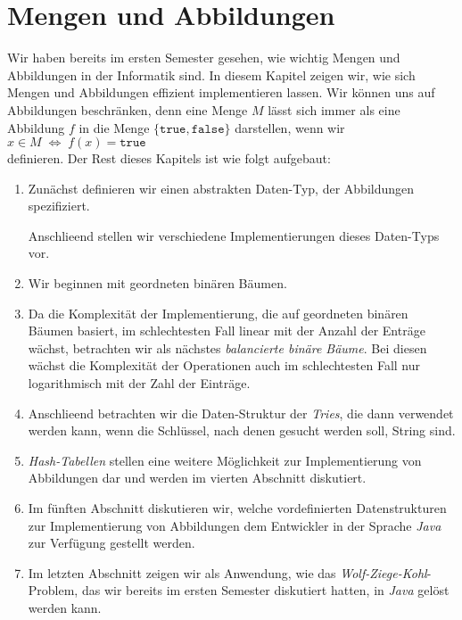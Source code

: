 \chapter{Mengen und Abbildungen}
Wir haben bereits im ersten Semester gesehen, wie wichtig Mengen und Abbildungen in
der Informatik sind.  In diesem Kapitel zeigen wir, wie sich Mengen und Abbildungen
effizient implementieren lassen.  Wir k\"onnen  uns auf Abbildungen beschr\"anken, denn eine
Menge $M$ l\"asst sich immer als eine Abbildung $f$ in die Menge $\{\mathtt{true}, \mathtt{false}\}$
darstellen, wenn wir
\\[0.2cm]
\hspace*{1.3cm}
$x \in M \; \Leftrightarrow \; f(x) = \mathtt{true}$
\\[0.2cm]
definieren.  Der Rest dieses Kapitels ist wie folgt aufgebaut:
\begin{enumerate}
\item Zun\"achst definieren wir einen abstrakten Daten-Typ, der Abbildungen spezifiziert.

      Anschlie\3end stellen wir verschiedene Implementierungen dieses Daten-Typs vor.

\item Wir beginnen mit geordneten bin\"aren B\"aumen.
\item Da die Komplexit\"at der Implementierung, die auf geordneten bin\"aren B\"aumen basiert,
      im schlechtesten Fall linear mit der Anzahl der Entr\"age w\"achst, betrachten wir als
      n\"achstes \emph{balancierte bin\"are B\"aume}.  Bei diesen w\"achst die Komplexit\"at der
      Operationen auch im schlechtesten Fall nur logarithmisch mit der Zahl der Eintr\"age.
\item Anschlie\3end betrachten wir die Daten-Struktur der \emph{Tries}, die dann verwendet
      werden kann, wenn die Schl\"ussel, nach denen gesucht werden soll, String sind.
\item \textsl{Hash-Tabellen} stellen eine weitere M\"oglichkeit zur Implementierung
      von Abbildungen dar und werden im vierten Abschnitt diskutiert.
\item Im f\"unften Abschnitt diskutieren wir, welche vordefinierten Datenstrukturen zur
      Implementierung von Abbildungen  dem Entwickler in der Sprache \textsl{Java} zur
      Verf\"ugung gestellt werden.
\item Im letzten Abschnitt zeigen wir als Anwendung, wie das
      \emph{Wolf-Ziege-Kohl}-Problem, das wir bereits im ersten Semester diskutiert
      hatten, in \textsl{Java} gel\"ost werden kann.
\end{enumerate}

